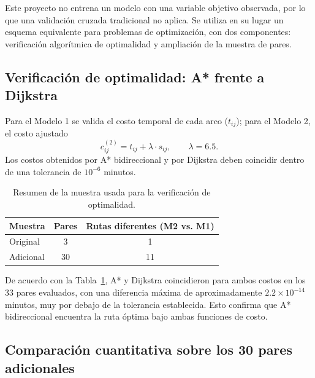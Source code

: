\documentclass[11pt]{article}
\numberwithin{equation}{section}
\begin{document}
Este proyecto no entrena un modelo con una variable objetivo observada, por lo que una validación cruzada tradicional no aplica. Se utiliza en su lugar un esquema equivalente para problemas de optimización, con dos componentes: verificación algorítmica de optimalidad y ampliación de la muestra de pares.

\subsection{Verificación de optimalidad: A* frente a Dijkstra}\label{subsec:optimalidad}

Para el Modelo 1 se valida el costo temporal de cada arco ($t_{ij}$); para el Modelo 2, el costo ajustado
\begin{equation}
    c^{(2)}_{ij} = t_{ij} + \lambda \cdot s_{ij}, \qquad \lambda = 6.5.
\end{equation}
Los costos obtenidos por A* bidireccional y por Dijkstra deben coincidir dentro de una tolerancia de $10^{-6}$ minutos.

\begin{table}[h!]
\centering
\begin{tabular}{lcc}
\toprule
\textbf{Muestra} & \textbf{Pares} & \textbf{Rutas diferentes (M2 vs. M1)} \\
\midrule
Original & 3 & 1 \\
Adicional & 30 & 11 \\
\bottomrule
\end{tabular}
\caption{Resumen de la muestra usada para la verificación de optimalidad.}
\label{tab:muestra_validacion}
\end{table}

De acuerdo con la Tabla~\ref{tab:muestra_validacion}, A* y Dijkstra coincidieron para ambos costos en los 33 pares evaluados, con una diferencia máxima de aproximadamente $2.2\times 10^{-14}$ minutos, muy por debajo de la tolerancia establecida. Esto confirma que A* bidireccional encuentra la ruta óptima bajo ambas funciones de costo.

\subsection{Comparación cuantitativa sobre los 30 pares adicionales}
\end{document}
